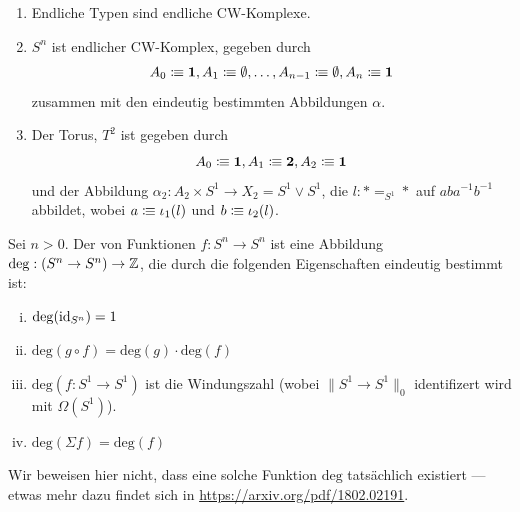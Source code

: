 \begin{beispiel}
  \begin{enumerate}
  \item Endliche Typen sind endliche CW-Komplexe.
  \item \(S^n\) ist endlicher CW-Komplex, gegeben durch
    \[
      A_0\vcentcolon\mspace{-1.2mu}\equiv \mathbf{1},A_1\vcentcolon\mspace{-1.2mu}\equiv \emptyset,\dots,A_{n-1}\vcentcolon\mspace{-1.2mu}\equiv \emptyset,A_n\vcentcolon\mspace{-1.2mu}\equiv \mathbf{1}
    \]
    zusammen mit den eindeutig bestimmten Abbildungen \(\alpha\).
  \item Der Torus, \(T^2\) ist gegeben durch
    \[
      A_0\vcentcolon\mspace{-1.2mu}\equiv\mathbf{1}, A_1\vcentcolon\mspace{-1.2mu}\equiv \mathbf{2}, A_2\vcentcolon\mspace{-1.2mu}\equiv \mathbf{1}
    \]
    und der Abbildung \(\alpha_{2}:A_2\times S^1\to X_2=S^1\vee S^1\), die \(l:\ast=_{S^1}\ast\) auf
    \(aba^{-1}b^{-1}\) abbildet, wobei \(a\vcentcolon\mspace{-1.2mu}\equiv \iota_1(l)\) und \(b\vcentcolon\mspace{-1.2mu}\equiv \iota_2(l)\).
  \end{enumerate}
\end{beispiel}

\begin{definition}
  Sei \(n>0\).
  Der  von Funktionen \(f:S^n\to S^n\) ist eine Abbildung
  \(\mathrm{deg}:(S^n\to S^n)\to \mathbb{Z}\), die durch die folgenden Eigenschaften eindeutig bestimmt ist:
  \begin{enumerate}[(i)]
  \item \(\mathrm{deg}(\mathrm{id}_{S^n})=1\)
  \item \(\mathrm{deg}(g\circ f)=\mathrm{deg}(g)\cdot \mathrm{deg}(f)\)
  \item \(\mathrm{deg}(f:S^1\to S^1)\) ist die Windungszahl (wobei \(\|S^1\to S^1\|_0\) identifizert wird mit \(\Omega(S^1)\)).
  \item \(\mathrm{deg}(\Sigma f)=\mathrm{deg}(f)\)
  \end{enumerate}
\end{definition}

Wir beweisen hier nicht, dass eine solche Funktion \(\mathrm{deg}\) tatsächlich existiert --- etwas mehr dazu findet sich in \url{https://arxiv.org/pdf/1802.02191}.

